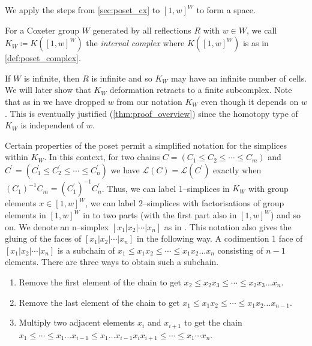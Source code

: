 \documentclass[class=article, crop=false]{standalone}
\begin{document}
We apply the steps from \cref{sec:poset_cx} to $[1,w]^W$ to form a space.

\begin{definition}
    For a Coxeter group $W$ generated by all reflections $R$ with $w \in W$, we call $K_{W} \coloneq K([1,w]^W)$ the \emph{interval complex} where $K([1,w]^W)$ is as in \cref{def:poset_complex}.
    \label{def:interval_complex}
\end{definition}

If $W$ is infinite, then $R$ is infinite and so $K_W$ may have an infinite number of cells. We will later show that $K_W$ deformation retracts to a finite subcomplex. Note that as in \cite{paolini_salvetti_kpi1_2021} we have dropped $w$ from our notation $K_{W}$ even though it depends on $w$. This is eventually justified (\cref{thm:proof_overview}) since the homotopy type of $K_W$ is independent of $w$.

Certain properties of the poset permit a simplified notation for the simplices within $K_{W}$. In this context, for two chains $C=(C_1 \leq C_2 \leq \cdots \leq C_m)$ and $C^\prime = (C_1^\prime \leq C_2^\prime \leq \cdots \leq C_n^\prime)$ we have $\mathcal{L}(C) = \mathcal{L}(C^\prime)$ exactly when $(C_1)^{-1}C_m = (C_1^\prime)^{-1}C_n^\prime$. Thus, we can label 1--simplices in $K_{W}$ with group elements $x \in [1,w]^W$, we can label 2--simplices with factorisations of group elements in $[1,w]^W$ in to two parts (with the first part also in $[1,w]^W$) and so on. We denote an n--simplex $[x_1 | x_2 | \cdots | x_n]$ as in \cite[Definition 2.8]{paolini_salvetti_kpi1_2021}. This notation also gives the gluing of the faces of $[x_1 | x_2 | \cdots | x_n]$ in the following way. A codimention 1 face of $[x_1 | x_2 | \cdots | x_n]$ is a subchain of $x_1 \leq x_1x_2 \leq \cdots \leq x_1x_2\ldots x_n$ consisting of $n-1$ elements. There are three ways to obtain such a subchain.
\begin{enumerate}
    \item \label{item:gluing_step_1} Remove the first element of the chain to get $x_2 \leq x_2x_3 \leq \cdots \leq x_2x_3\ldots x_n$.
    \item \label{item:gluing_step_2} Remove the last element of the chain to get $x_1 \leq x_1x_2 \leq \cdots \leq x_1x_2\ldots x_{n-1}$.
    \item \label{item:gluing_step_3} Multiply two adjacent elements $x_i$ and $x_{i+1}$ to get the chain $x_1 \leq \cdots \leq x_1 \ldots x_{i-1} \leq x_1 \ldots x_{i-1}x_ix_{i+1} \leq \cdots \leq x_1\cdots x_n$.
\end{enumerate}
\end{document}
